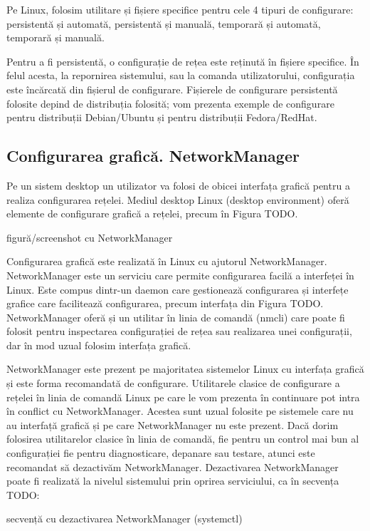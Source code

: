 Pe Linux, folosim utilitare și fișiere specifice pentru cele 4 tipuri de configurare: persistentă și automată, persistentă și manuală, temporară și automată, temporară și manuală.

Pentru a fi persistentă, o configurație de rețea este reținută în fișiere specifice. În felul acesta, la repornirea sistemului, sau la comanda utilizatorului, configurația este încărcată din fișierul de configurare. Fișierele de configurare persistentă folosite depind de distribuția folosită; vom prezenta exemple de configurare pentru distribuții Debian/Ubuntu și pentru distribuții Fedora/RedHat.

\subsection{Configurarea grafică. NetworkManager}
\label{sec:net:graphical-config}

Pe un sistem desktop un utilizator va folosi de obicei interfața grafică pentru a realiza configurarea rețelei. Mediul desktop Linux (desktop environment) oferă elemente de configurare grafică a rețelei, precum în Figura TODO.

figură/screenshot cu NetworkManager

Configurarea grafică este realizată în Linux cu ajutorul NetworkManager. NetworkManager este un serviciu care permite configurarea facilă a interfeței în Linux. Este compus dintr-un daemon care gestionează configurarea și interfețe grafice care facilitează configurarea, precum interfața din Figura TODO. NetworkManager oferă și un utilitar în linia de comandă (nmcli) care poate fi folosit pentru inspectarea configurației de rețea sau realizarea unei configurații, dar în mod uzual folosim interfața grafică.

NetworkManager este prezent pe majoritatea sistemelor Linux cu interfața grafică și este forma recomandată de configurare. Utilitarele clasice de configurare a rețelei în linia de comandă Linux pe care le vom prezenta în continuare pot intra în conflict cu NetworkManager. Acestea sunt uzual folosite pe sistemele care nu au interfață grafică și pe care NetworkManager nu este prezent. Dacă dorim folosirea utilitarelor clasice în linia de comandă, fie pentru un control mai bun al configurației fie pentru diagnosticare, depanare sau testare, atunci este recomandat să dezactivăm NetworkManager. Dezactivarea NetworkManager poate fi realizată la nivelul sistemului prin oprirea serviciului, ca în secvența TODO:

secvență cu dezactivarea NetworkManager (systemctl)

